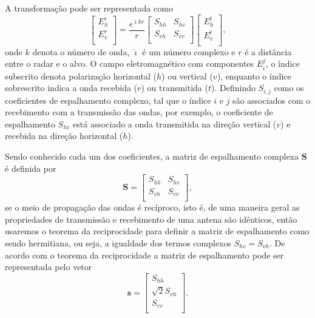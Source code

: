 \documentclass[remotesensing,article,submit,moreauthors,pdftex]{Definitions/mdpi}
\begin{document}
A transformação pode ser representada como
\begin{equation}\label{cap_acf_1}
 \left[
\begin{array}{c}
	E_{h}^{r}   \\
	E_{v}^{r}    \\
\end{array}
\right]
 = \frac{e^{\hat{\imath} kr}}{r}\left[
\begin{array}{cc}
	S_{hh}   & S_{hv}   \\
	S_{vh}   & S_{vv}   \\
\end{array}
\right]
 \left[
\begin{array}{c}
	E_{h}^{t}   \\
	E_{v}^{t}    \\
\end{array}
\right],
\end{equation}
onde $k$ denota o número de onda, $\hat{\imath}$ é um número complexo e $r$ é a distância entre o radar e o alvo. O campo eletromagnético com componentes $E_{i}^{j}$, o índice subscrito denota polarização horizontal ($h$) ou vertical ($v$),  enquanto o índice sobrescrito indica a onda recebida ($r$) ou transmitida ($t$). Definindo $S_{i,j}$ como os coeficientes de espalhamento complexo, tal que o índice $i$ e $j$ são associados com o recebimento com a transmissão das ondas, por exemplo, o coeficiente de espalhamento $S_{hv}$ está associado a onda transmitida na direção vertical ($v$) e recebida na direção horizontal ($h$).

Sendo conhecido cada um dos coeficientes, a matriz de espalhamento complexa $\mathbf{S}$ é definida por
\begin{equation}\label{cap_acf_2}
\mathbf{S} = \left[
\begin{array}{cc}
	S_{hh}   & S_{hv}   \\
	S_{vh}   & S_{vv}   \\
\end{array}
\right],
\end{equation}
se o meio de propagação das ondas é recíproco, isto é, de uma maneira geral as propriedades de transmissão e recebimento de uma antena são idênticos, então usaremos o teorema da reciprocidade \cite{lp} para definir a matriz de espalhamento como sendo hermitiana, ou seja, a igualdade dos termos complexos $S_{hv}=S_{vh}$. De acordo com o teorema da reciprocidade a matriz de espalhamento pode ser representada pelo vetor
\begin{equation}\label{cap_acf_3}
\mathbf{s} = \left[
\begin{array}{c}
	S_{hh}      \\
        \sqrt{2}S_{vh}     \\
	S_{vv}      \\
\end{array}
\right].
\end{equation}
\end{document}

